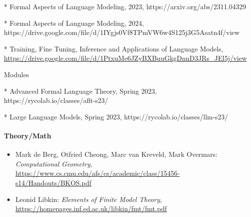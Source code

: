 * Formal Aspects of Language Modeling, 2023, https://arxiv.org/abs/2311.04329

* Formal Aspects of Language Modeling, 2024, https://drive.google.com/file/d/1IYgjs0Vf8TPmVW6w4S125j3G5Asatn4f/view

* Training, Fine Tuning, Inference and Applications of Language Models, 
\url{https://drive.google.com/file/d/1PtxuMe6JZyBXBuuGkgDnnD3JRs_JEl5j/view}

Modules

* Advanced Formal Language Theory, Spring 2023, https://rycolab.io/classes/aflt-s23/

* Large Language Models, Spring 2023, https://rycolab.io/classes/llm-s23/

\paragraph{Theory/Math}

\begin{itemize}
\item Mark de Berg, Otfried Cheong, Marc van Kreveld, Mark Overmars: 
\textit{Computational Geometry},
\url{https://www.cs.cmu.edu/afs/cs/academic/class/15456-s14/Handouts/BKOS.pdf}

\item Leonid Libkin: 
\textit{Elements of Finite Model Theory},
\url{https://homepages.inf.ed.ac.uk/libkin/fmt/fmt.pdf}
\end{itemize}
